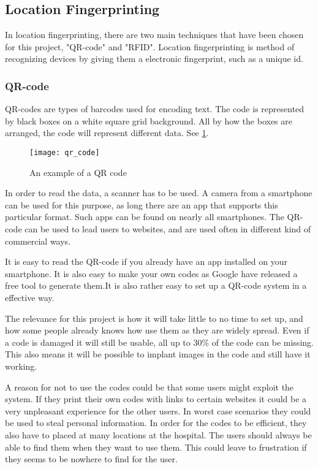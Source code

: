 \subsection{Location Fingerprinting}
In location fingerprinting, there are two main techniques that have been chosen for this project, "QR-code" and "RFID". Location fingerprinting is method of recognizing devices by giving them a electronic fingerprint, such as a unique id.

\subsubsection{QR-code} %
QR-codes are types of barcodes used for encoding text. The code is represented by black boxes on a white square grid background. All by how the boxes are arranged, the code will represent different data. See \cref{fig:qr}.

\begin{figure}
	\begin{center}
		\texttt{[image: qr\_code]}
	\end{center}
	\caption{An example of a QR code}
	\label{fig:qr}
\end{figure}

In order to read the data, a scanner has to be used. A camera from a smartphone can be used for this purpose, as long there are an app that supports this particular format. Such apps can be found on nearly all smartphones\cite{QR_smart}. The QR-code can be used to lead users to websites, and are used often in different kind of commercial ways\cite{QR_url}.

It is easy to read the QR-code if you already have an app installed on your smartphone. It is also easy to make your own codes as Google have released a free tool to generate them\cite{QR_Google}.It is also rather easy to set up a QR-code system in a effective way\cite{QR_easy}.

The relevance for this project is how it will take little to no time to set up\cite{QR_rel1}, and how some people already knows how use them as they are widely spread\cite{QR_spread}. Even if a code is damaged it will still be usable, all up to 30\% of the code can be missing\cite{QR_dama}. This also means it will be possible to implant images in the code and still have it working\cite{QR_image}.

A reason for not to use the codes could be that some users might exploit the system. If they print their own codes with links to certain websites it could be a very unpleasant experience for the other users\cite{QR_urlbad}. In worst case scenarios they could be used to steal personal information\cite{QR_information}.
In order for the codes to be efficient, they also have to placed at many locations at the hospital. The users should always be able to find them when they want to use them. This could leave to frustration if they seems to be nowhere to find for the user.


